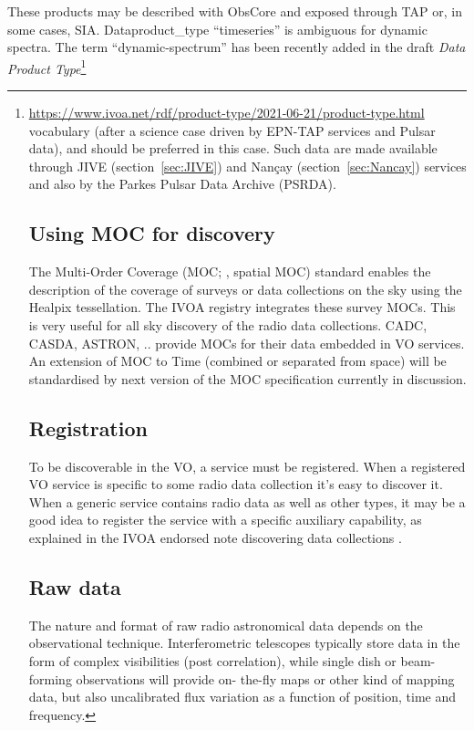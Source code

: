 \documentclass[11pt,a4paper]{ivoatex/ivoa}
\begin{document}
These products may be described with ObsCore and exposed through TAP or, in some cases, SIA. 
Dataproduct\_type ``timeseries'' is ambiguous for dynamic spectra. The term ``dynamic-spectrum'' 
has been recently added in the draft \emph{Data Product Type}\footnote{\url{https://www.ivoa.net/rdf/product-type/2021-06-21/product-type.html}
vocabulary (after a science case driven by EPN-TAP services and Pulsar data), and should be preferred in this case. 
Such data are made available through JIVE 
(section~\ref{sec:JIVE}) and Nan\c cay (section~\ref{sec:Nancay}) services and also by the Parkes Pulsar 
Data Archive (PSRDA).

\subsection{Using MOC for discovery}

The Multi-Order Coverage (MOC; \cite{2019ivoa.spec.1007F}, spatial MOC) standard enables the description 
of the coverage of surveys or data collections on the sky using the Healpix tessellation. The IVOA 
registry integrates these survey MOCs. This is very useful for all sky discovery of the radio data 
collections. CADC, CASDA, ASTRON, .. provide MOCs for their data embedded in VO services. An extension 
of MOC to Time (combined or separated from space) will be standardised by next version of the MOC 
specification currently in discussion.

\subsection{Registration} 
To be discoverable in the VO, a service must be registered. When a registered VO service is specific to 
some radio data collection it's easy to discover it. When a generic service contains radio data as well 
as other types, it may be a good idea to register the service with a specific auxiliary capability, as 
explained in the IVOA endorsed note discovering data collections \citep{2019ivoa.rept.0520D}.

\section{Raw data}
The nature and format of raw radio astronomical data 
depends on the observational technique. Interferometric telescopes typically store data in the form of 
complex visibilities (post correlation), while single dish or beam-forming observations will provide on-
the-fly maps or other kind of mapping data, but also uncalibrated flux variation as a function of 
position, time and frequency. 

}
\end{document}
